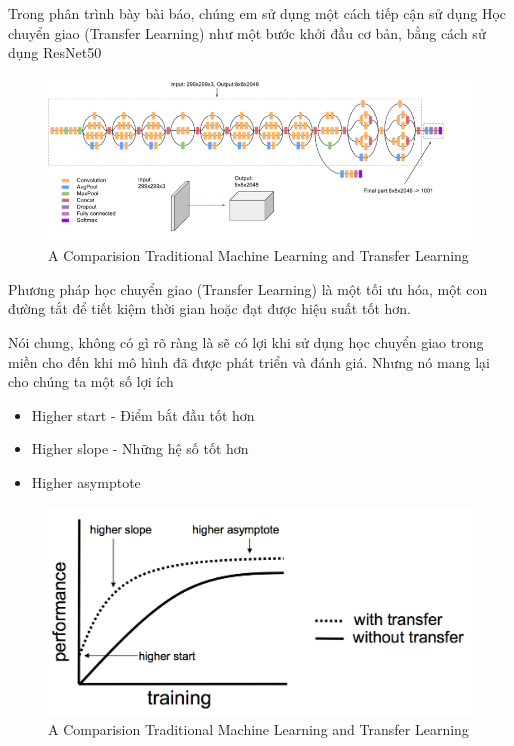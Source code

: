\documentclass{article}
\begin{document}
	Trong phân trình bày bài báo, chúng em sử dụng một cách tiếp cận sử dụng Học chuyển giao (Transfer Learning) như một bước khởi đầu cơ bản, bằng cách sử dụng ResNet50
	\begin{figure}[H]
		\centering
		\includegraphics[width=1\linewidth]{architecture/Transfer_learning_as_a_starting_point.png}
		\caption{A Comparision Traditional Machine Learning and Transfer Learning}
		\label{fig:writing-thesis}
	\end{figure}
	Phương pháp học chuyển giao (Transfer Learning) là một tối ưu hóa, một con đường tắt để tiết kiệm thời gian hoặc đạt được hiệu suất tốt hơn.
	
	Nói chung, không có gì rõ ràng là sẽ có lợi khi sử dụng học chuyển giao trong miền cho đến khi mô hình đã được phát triển và đánh giá. Nhưng nó mang lại cho chúng ta một số lợi ích
	\begin{itemize}
		\item Higher start - Điểm bắt đầu tốt hơn
		\item Higher slope - Những hệ số tốt hơn
		\item Higher asymptote
	\end{itemize}
	\begin{figure}[H]
		\centering
		\includegraphics[width=1\linewidth]{architecture/performance_transfer_learning.png}
		\caption{A Comparision Traditional Machine Learning and Transfer Learning}
		\label{fig:writing-thesis}
	\end{figure}
\end{document}
